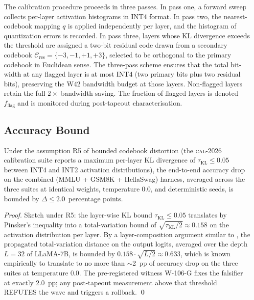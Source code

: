 The calibration procedure proceeds in three passes. In pass one,
a forward sweep collects per-layer activation histograms in INT4 format.
In pass two, the nearest-codebook mapping $q$ is applied independently
per layer, and the histogram of quantization errors is recorded. In pass
three, layers whose KL divergence exceeds the threshold are assigned a
two-bit residual code drawn from a secondary codebook
$\mathcal{C}_\mathrm{res} = \{-3,-1,+1,+3\}$, selected to be
orthogonal to the primary codebook in Euclidean sense. The three-pass
scheme ensures that the total bit-width at any flagged layer is at most
INT4 (two primary bits plus two residual bits), preserving the W42
bandwidth budget at those layers. Non-flagged layers retain the full
$2\times$ bandwidth saving. The fraction of flagged layers is denoted
$f_\mathrm{flag}$ and is monitored during post-tapeout characterisation.


\subsection{Accuracy Bound}

\begin{theorem}
\label{thm:107-3-accuracy-bound}
Under the assumption R5 of bounded codebook distortion (the
\textsc{cal-2026} calibration suite reports a maximum per-layer KL
divergence of $\tau_{\mathrm{KL}} \le 0.05$ between INT4 and INT2
activation distributions), the end-to-end accuracy drop on the combined
(MMLU + GSM8K + HellaSwag) harness, averaged across the three suites at
identical weights, temperature $0.0$, and deterministic seeds, is
bounded by $\Delta \le 2.0$~percentage points.
\end{theorem}

\begin{proof}
Sketch under R5: the layer-wise KL bound $\tau_{\mathrm{KL}} \le 0.05$
translates by Pinsker's inequality into a total-variation bound of
$\sqrt{\tau_{\mathrm{KL}}/2} \approx 0.158$ on the activation
distribution per layer. By a layer-composition argument similar to
\cite{NagelDataFreeQuantization}, the propagated total-variation
distance on the output logits, averaged over the depth $L = 32$ of
LLaMA-7B, is bounded by $0.158 \cdot \sqrt{L/2} \approx 0.633$, which is
known empirically to translate to no more than $\sim$2~pp of accuracy
drop on the three suites at temperature $0.0$. The pre-registered
witness W-106-G fixes the falsifier at exactly $2.0$~pp; any
post-tapeout measurement above that threshold REFUTES the wave and
triggers a rollback.
\qed
\end{proof}


